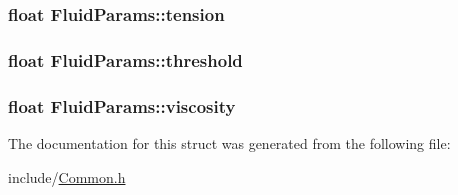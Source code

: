 \hypertarget{structFluidParams_ad323627b5c0be00ef6d144f459807dbb}{
\subsubsection[{tension}]{\setlength{\rightskip}{0pt plus 5cm}float {\bf FluidParams::tension}}}
\label{structFluidParams_ad323627b5c0be00ef6d144f459807dbb}
\hypertarget{structFluidParams_a3a318ea442178b0ad9982a55694168e1}{
\subsubsection[{threshold}]{\setlength{\rightskip}{0pt plus 5cm}float {\bf FluidParams::threshold}}}
\label{structFluidParams_a3a318ea442178b0ad9982a55694168e1}
\hypertarget{structFluidParams_a1bc83e65f9ffee642dd76e86ec372fbb}{
\subsubsection[{viscosity}]{\setlength{\rightskip}{0pt plus 5cm}float {\bf FluidParams::viscosity}}}
\label{structFluidParams_a1bc83e65f9ffee642dd76e86ec372fbb}


The documentation for this struct was generated from the following file:\begin{DoxyCompactItemize}
\item 
include/\hyperlink{Common_8h}{Common.h}\end{DoxyCompactItemize}
